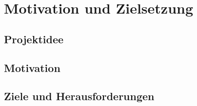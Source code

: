 \section{Motivation und Zielsetzung}
\subsection{Projektidee}
\subsection{Motivation}
\subsection{Ziele und Herausforderungen}
